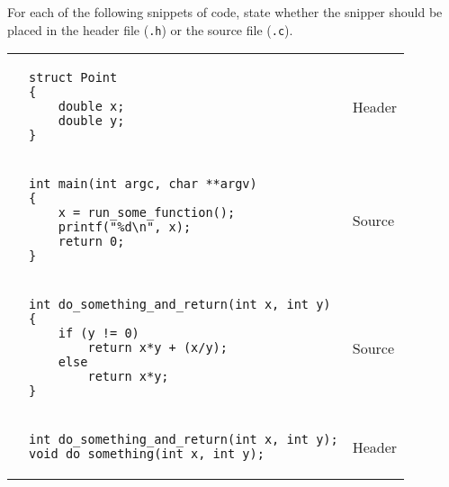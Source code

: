 For each of the following snippets of code, state whether the snipper should be placed in the header file (\texttt{.h}) or the source file (\texttt{.c}).

\begin{enumerate}

\begin{tabular}{p{.25in}p{4.5in} p{2in}}
\item
&
\begin{lstlisting}
struct Point
{
	double x;
	double y;
}
\end{lstlisting}
&
\begin{answer}
Header
\end{answer}
\\
\item
&
\begin{lstlisting}
int main(int argc, char **argv)
{
	x = run_some_function();
	printf("%d\n", x);
	return 0;
}
\end{lstlisting}
&
\begin{answer}
Source
\end{answer}
\\
\item
&
\begin{lstlisting}
int do_something_and_return(int x, int y)
{
	if (y != 0)
		return x*y + (x/y);
	else
		return x*y;
}
\end{lstlisting}
&
\begin{answer}
Source
\end{answer}
\\
\item
&
\begin{lstlisting}
int do_something_and_return(int x, int y);
void do_something(int x, int y);
\end{lstlisting}
&
\begin{answer}
Header
\end{answer}
\\
\end{tabular}
\end{enumerate}
